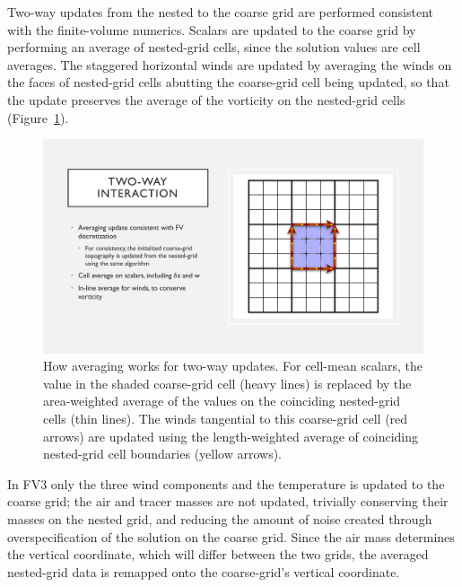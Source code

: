 \documentclass[10pt,letterpaper,margin=1in]{memoir}
\begin{document}
Two-way updates from the nested to the coarse grid are performed consistent with the finite-volume numerics. Scalars are updated to the coarse grid by performing an average of nested-grid cells, since the solution values are cell averages. The staggered horizontal winds are updated by averaging the winds on the faces of nested-grid cells abutting the coarse-grid cell being updated, so that the update preserves the average of the vorticity on the nested-grid cells (Figure~\ref{fig:twowayschematic}). 
\begin{figure}[tbp]
   \centering
   \includegraphics{twowayschematic.pdf} %
   \caption{How averaging works for two-way updates. For cell-mean scalars, the value in the shaded coarse-grid cell (heavy lines) is replaced by the area-weighted average of the values on the coinciding nested-grid cells (thin lines). The winds tangential to this coarse-grid cell (red arrows) are updated using the length-weighted average of coinciding nested-grid cell boundaries (yellow arrows). }
   \label{fig:twowayschematic}
\end{figure}
 In FV3 only the three wind components and the temperature is updated to the coarse grid; the air and tracer masses are not updated, trivially conserving their masses on the nested grid, and reducing the amount of noise created through overspecification of the solution on the coarse grid. Since the air mass determines the vertical coordinate, which will differ between the two grids, the averaged nested-grid data is remapped onto the coarse-grid's vertical coordinate.
\end{document}
